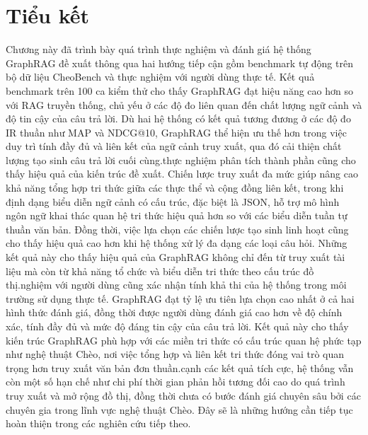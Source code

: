 
\section*{Tiểu kết}

Chương này đã trình bày quá trình thực nghiệm và đánh giá hệ thống GraphRAG đề xuất thông qua hai hướng tiếp cận gồm benchmark tự động trên bộ dữ liệu CheoBench và thực nghiệm với người dùng thực tế. Kết quả benchmark trên 100 ca kiểm thử cho thấy GraphRAG đạt hiệu năng cao hơn so với RAG truyền thống, chủ yếu ở các độ đo liên quan đến chất lượng ngữ cảnh và độ tin cậy của câu trả lời. Dù hai hệ thống có kết quả tương đương ở các độ đo IR thuần như MAP và NDCG@10, GraphRAG thể hiện ưu thế hơn trong việc duy trì tính đầy đủ và liên kết của ngữ cảnh truy xuất, qua đó cải thiện chất lượng tạo sinh câu trả lời cuối cùng.\n{} thực nghiệm phân tích thành phần cũng cho thấy hiệu quả của kiến trúc đề xuất. Chiến lược truy xuất đa mức giúp nâng cao khả năng tổng hợp tri thức giữa các thực thể và cộng đồng liên kết, trong khi định dạng biểu diễn ngữ cảnh có cấu trúc, đặc biệt là JSON, hỗ trợ mô hình ngôn ngữ khai thác quan hệ tri thức hiệu quả hơn so với các biểu diễn tuần tự thuần văn bản. Đồng thời, việc lựa chọn các chiến lược tạo sinh linh hoạt cũng cho thấy hiệu quả cao hơn khi hệ thống xử lý đa dạng các loại câu hỏi. Những kết quả này cho thấy hiệu quả của GraphRAG không chỉ đến từ truy xuất tài liệu mà còn từ khả năng tổ chức và biểu diễn tri thức theo cấu trúc đồ thị.\n{} nghiệm với người dùng cũng xác nhận tính khả thi của hệ thống trong môi trường sử dụng thực tế. GraphRAG đạt tỷ lệ ưu tiên lựa chọn cao nhất ở cả hai hình thức đánh giá, đồng thời được người dùng đánh giá cao hơn về độ chính xác, tính đầy đủ và mức độ đáng tin cậy của câu trả lời. Kết quả này cho thấy kiến trúc GraphRAG phù hợp với các miền tri thức có cấu trúc quan hệ phức tạp như nghệ thuật Chèo, nơi việc tổng hợp và liên kết tri thức đóng vai trò quan trọng hơn truy xuất văn bản đơn thuần.\n{} cạnh các kết quả tích cực, hệ thống vẫn còn một số hạn chế như chi phí thời gian phản hồi tương đối cao do quá trình truy xuất và mở rộng đồ thị, đồng thời chưa có bước đánh giá chuyên sâu bởi các chuyên gia trong lĩnh vực nghệ thuật Chèo. Đây sẽ là những hướng cần tiếp tục hoàn thiện trong các nghiên cứu tiếp theo.
